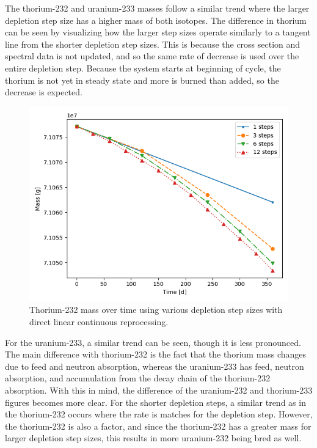 The thorium-232 and uranium-233 masses follow a similar trend where the larger depletion step size has a higher mass of both isotopes. The difference in thorium can be seen by visualizing how the larger step sizes operate similarly to a tangent line from the shorter depletion step sizes. This is because the cross section and spectral data is not updated, and so the same rate of decrease is used over the entire depletion step. Because the system starts at beginning of cycle, the thorium is not yet in steady state and more is burned than added, so the decrease is expected. 

\begin{figure}[H]
  \centering
  \includegraphics[scale=0.5]{images/DL_NSTEP_Th-232_mass-large.png}
  \caption{Thorium-232 mass over time using various depletion step sizes with direct linear continuous reprocessing.}
   \label{fig:DL-cont-th-2}
\end{figure}

For the uranium-233, a similar trend can be seen, though it is less pronounced. The main difference with thorium-232 is the fact that the thorium mass changes due to feed and neutron absorption, whereas the uranium-233 has feed, neutron absorption, and accumulation from the decay chain of the thorium-232 absorption. With this in mind, the difference of the uranium-232 and thorium-233 figures becomes more clear. For the shorter depletion steps, a similar trend as in the thorium-232 occurs where the rate is matches for the depletion step. However, the thorium-232 is also a factor, and since the thorium-232 has a greater mass for larger depletion step sizes, this results in more uranium-232 being bred as well.

